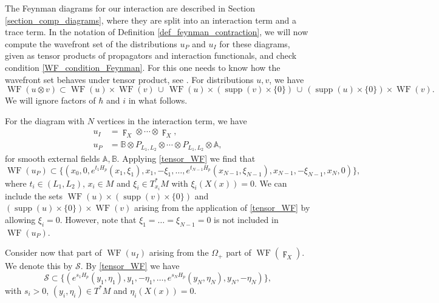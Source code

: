 \documentclass[reqno]{amsart}
\theoremstyle{definition}
\theoremstyle{remark}
\newcommand{\A}{\mathbb{A}}
\newcommand{\B}{\mathbb{B}}
\DeclareMathOperator{\WF}{WF}
\DeclareMathOperator{\supp}{supp}
\begin{document}
The Feynman diagrams for our interaction are described in Section \ref{section_comp_diagrams}, where they are split into an interaction term and a trace term. In the notation of Definition \ref{def_feynman_contraction}, we will now compute the wavefront set of the distributions $u_P$ and $u_I$ for these diagrams, given as tensor products of propagators and interaction functionals, and check condition \eqref{WF_condition_Feynman}. 
For this one needs to know how the wavefront set behaves under tensor product, see \cite[Theorem 8.2.9]{hormander1}. For distributions $u,v$, we have
\begin{equation}
\label{tensor_WF}
    \WF(u\otimes v) \subset \WF(u)\times\WF(v) \,\cup\, \WF(u)\times(\supp(v)\times\{0\}) \,\cup\, (\supp(u)\times\{0\})\times\WF(v).
\end{equation}
We will ignore factors of $\hbar$ and $i$ in what follows.

For the diagram with $N$ vertices in the interaction term, we have
\begin{subequations}\label{expression_uI_uP}\begin{align}
u_I &= \digamma_X\otimes\cdots\otimes\digamma_X, \\
u_P &= \B\otimes P_{L_1,L_2}\otimes\cdots\otimes P_{L_1,L_2}\otimes\A,
\end{align}\end{subequations}
for smooth external fields $\A,\B$. Applying \eqref{tensor_WF} we find that
\begin{equation*}
    \WF(u_P) \subset \{(x_0,0,e^{t_1H_p}(x_1,\xi_1),x_1,-\xi_1,\dots,e^{t_{N-1}H_p}(x_{N-1},\xi_{N-1}),x_{N-1},-\xi_{N-1},x_N,0)\},
\end{equation*}
where $t_i\in(L_1,L_2)$, $x_i\in M$ and $\xi_i\in T_{x_i}^*M$ with $\xi_i(X(x))=0$. We can include the sets $\WF(u)\times(\supp(v)\times\{0\})$ and $(\supp(u)\times\{0\})\times\WF(v)$ arising from the application of \eqref{tensor_WF} by allowing $\xi_i=0$. However, note that $\xi_1=\dots=\xi_{N-1}=0$ is not included in $\WF(u_P)$.

Consider now that part of $\WF(u_I)$ arising from the $\Omega_+$ part of $\WF(\digamma_X)$. We denote this by $\mathcal{S}$. By \eqref{tensor_WF} we have
\begin{equation*}
    \mathcal{S} \subset \{(e^{s_1H_p}(y_1,\eta_1),y_1,-\eta_1,\dots,e^{s_{N}H_p}(y_{N},\eta_{N}),y_{N},-\eta_{N})\},
\end{equation*}
with $s_i>0$, $(y_i,\eta_i)\in T^*M$ and $\eta_i(X(x))=0$.
\end{document}
